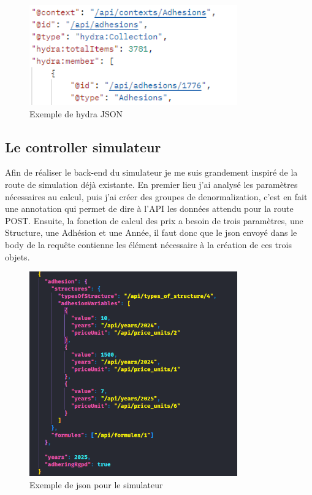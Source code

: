 \documentclass[a4paper,12pt]{report}
\begin{document}
\begin{figure}[ht]
    \centering
    \includegraphics[width=0.8\textwidth]{hydraJSON.png}
    \caption{Exemple de hydra JSON}
    \label{fig:hyda-json}
\end{figure}

\subsection{Le controller simulateur}
Afin de réaliser le back-end du simulateur je me suis grandement inspiré de la route de simulation déjà existante. En premier lieu j'ai analysé les paramètres nécessaires au calcul, puis j'ai créer des groupes de denormalization, c'est en fait une annotation qui permet de dire à l'API les données attendu pour la route POST. Ensuite, la fonction de calcul des prix a besoin de trois paramètres, une Structure, une Adhésion et une Année, il faut donc que le json envoyé dans le body de la requête contienne les élément nécessaire à la création de ces trois objets.

\begin{figure}[h]
    \centering
    \includegraphics[width=0.8\textwidth]{jsonSimu.png}
    \caption{Exemple de json pour le simulateur}
    \label{fig:json-simu}
\end{figure}
\end{document}
